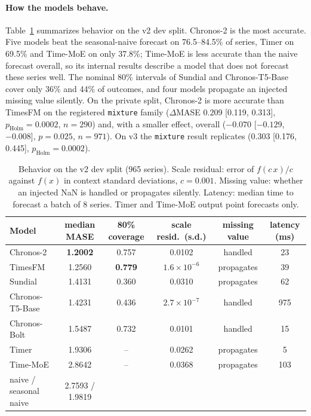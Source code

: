 \paragraph{How the models behave.} Table~\ref{tab:character} summarizes behavior on the v2 dev split. Chronos-2 is the
most accurate. Five models beat the seasonal-naive forecast on 76.5--84.5\% of series, Timer on 69.5\% and Time-MoE on only
37.8\%; Time-MoE is less accurate than the naive forecast overall, so its internal results describe a model that does not
forecast these series well. The nominal 80\% intervals of Sundial and Chronos-T5-Base cover only 36\% and 44\% of outcomes, and four models propagate
an injected missing value silently. On the private split, Chronos-2 is more accurate than TimesFM on the registered
\texttt{mixture} family ($\Delta$MASE 0.209 [0.119, 0.313], $p_{\text{Holm}}=0.0002$, $n=290$) and, with a smaller effect,
overall ($-0.070$ [$-0.129$, $-0.008$], $p=0.025$, $n=971$). On v3 the \texttt{mixture} result replicates (0.303 [0.176,
0.445], $p_{\text{Holm}}=0.0002$).

\begin{table}[!tb]
\centering
\footnotesize
\setlength{\tabcolsep}{4pt}
\begin{tabular}{@{}lccccc@{}}
\toprule
Model & median MASE & 80\% coverage & scale resid.\ (s.d.) & missing value & latency (ms) \\
\midrule
\textcolor{ctwo}{Chronos-2}    & \textbf{1.2002} & 0.757 & 0.0102 & handled & 23 \\
\textcolor{tfm}{TimesFM}       & 1.2560 & \textbf{0.779} & $1.6\times10^{-6}$ & propagates & 39 \\
\textcolor{sun}{Sundial}       & 1.4131 & 0.360 & 0.0310 & propagates & 62 \\
\textcolor{tt5}{Chronos-T5-Base} & 1.4231 & 0.436 & $2.7\times10^{-7}$ & handled & 975 \\
\textcolor{bolt}{Chronos-Bolt} & 1.5487 & 0.732 & 0.0101 & handled & 15 \\
\textcolor{timer}{Timer}       & 1.9306 & -- & 0.0262 & propagates & 5 \\
\textcolor{tmoe}{Time-MoE}     & 2.8642 & -- & 0.0368 & propagates & 103 \\
\midrule
naive / seasonal naive & 2.7593 / 1.9819 & & & & \\
\bottomrule
\end{tabular}
\caption{Behavior on the v2 dev split (965 series). Scale residual: error of $f(c\,x)/c$ against $f(x)$ in context
standard deviations, $c=0.001$. Missing value: whether an injected NaN is handled or propagates silently. Latency: median
time to forecast a batch of 8 series. Timer and Time-MoE output point forecasts only.}
\label{tab:character}
\end{table}
